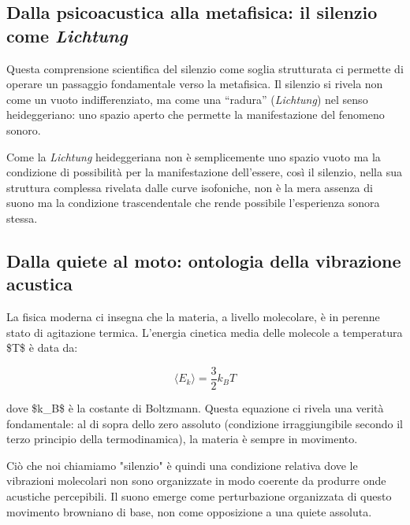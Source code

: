 \documentclass[a4paper,11pt]{article}
\begin{document}
\subsection{Dalla psicoacustica alla metafisica: il silenzio come \emph{Lichtung}}\hypertarget{dalla-psicoacustica-alla-metafisica-il-silenzio-come-lichtung}{}\label{dalla-psicoacustica-alla-metafisica-il-silenzio-come-lichtung}

Questa comprensione scientifica del silenzio come soglia strutturata ci
permette di operare un passaggio fondamentale verso la metafisica. Il
silenzio si rivela non come un vuoto indifferenziato, ma come una
``radura'' (\emph{Lichtung}) nel senso heideggeriano: uno spazio aperto che
permette la manifestazione del fenomeno sonoro.

Come la \emph{Lichtung} heideggeriana non è semplicemente uno spazio vuoto ma
la condizione di possibilità per la manifestazione dell'essere, così il
silenzio, nella sua struttura complessa rivelata dalle curve isofoniche,
non è la mera assenza di suono ma la condizione trascendentale che rende
possibile l'esperienza sonora stessa.

\subsection{Dalla quiete al moto: ontologia della vibrazione acustica}\hypertarget{dalla-quiete-al-moto-ontologia-della-vibrazione-acustica}{}\label{dalla-quiete-al-moto-ontologia-della-vibrazione-acustica}

La fisica moderna ci insegna che la materia, a livello molecolare, è in
perenne stato di agitazione termica. L'energia cinetica media delle
molecole a temperatura \$T\$ è data da:

\begin{displaymath}
\langle E_k \rangle = \frac{3}{2}k_BT
\end{displaymath}

dove \$k\_B\$ è la costante di Boltzmann. Questa equazione ci rivela una
verità fondamentale: al di sopra dello zero assoluto (condizione
irraggiungibile secondo il terzo principio della termodinamica), la
materia è sempre in movimento.

Ciò che noi chiamiamo "silenzio" è quindi una condizione relativa dove
le vibrazioni molecolari non sono organizzate in modo coerente da
produrre onde acustiche percepibili. Il suono emerge come perturbazione
organizzata di questo movimento browniano di base, non come opposizione
a una quiete assoluta.
\end{document}

